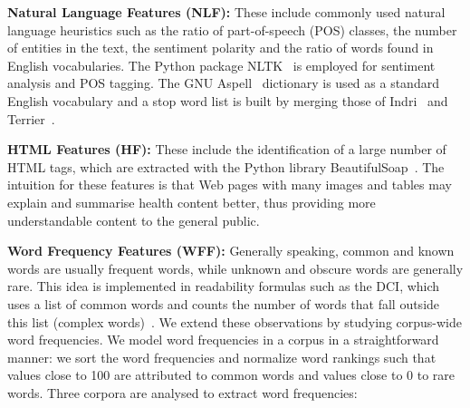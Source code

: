 \textbf{Natural Language Features (NLF):}
These include commonly used natural language heuristics such as the ratio of part-of-speech (POS) classes, the number of entities in the text, the sentiment polarity and the ratio of words found in English vocabularies. The Python package NLTK~\cite{nltk} is employed for sentiment analysis and POS tagging. The GNU Aspell~\cite{aspell} dictionary is used as a standard English vocabulary and a stop word list is built by merging those of Indri~\cite{indri} and Terrier~\cite{terrier}. 

\textbf{HTML Features (HF):}
These include the identification of a large number of HTML tags, which are extracted with the Python library BeautifulSoap~\cite{bs4}. The intuition for these features is that Web pages with many images and tables may explain and summarise health content better, thus providing more understandable content to the general public. 

\textbf{Word Frequency Features (WFF):}
Generally speaking, common and known words are usually frequent words, while unknown and obscure words are generally rare. This idea is implemented in readability formulas such as the DCI, which uses a list of common words and counts the number of words that fall outside this list (complex words)~\cite{dale48}.
We extend these observations by studying corpus-wide word frequencies. 
We model word frequencies in a corpus in a straightforward manner: we sort the word frequencies and normalize word rankings such that values close to 100 are attributed to common words and values close to 0 to rare words. Three corpora are analysed to extract word frequencies:

